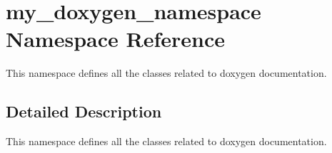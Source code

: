 \hypertarget{namespacemy__doxygen__namespace}{}\section{my\+\_\+doxygen\+\_\+namespace Namespace Reference}
\label{namespacemy__doxygen__namespace}


This namespace defines all the classes related to doxygen documentation.  




\subsection{Detailed Description}
This namespace defines all the classes related to doxygen documentation. 